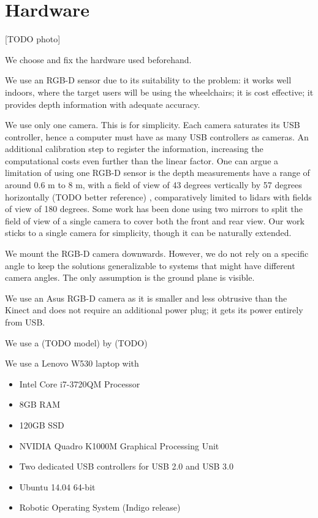 \section{Hardware}

[TODO photo]

We choose and fix the hardware used beforehand.

We use an RGB-D sensor due to its suitability to the problem:
it works well indoors, where the target users will be using the wheelchairs; it
is cost effective; it provides depth information with adequate accuracy.

We use only one camera. This is for simplicity. Each camera saturates its USB
controller, hence a computer must have as many USB controllers as cameras.
An additional calibration step to register the information, increasing the
computational costs even further than the linear factor. 
One can argue a limitation of using one RGB-D sensor is the depth measurements
have a range of around 0.6 m to 8 m, with a field of view of 43 degrees
vertically by 57 degrees horizontally (TODO better reference) \cite{endres2014catadioptric},
comparatively limited to lidars with fields of view of 180 degrees. Some work
\cite{endres2014catadioptric} has been done using two mirrors to split the field
of view of a single camera to cover both the front and rear view. Our work
sticks to a single camera for simplicity, though it can be naturally extended.

We mount the RGB-D camera downwards. However, we do not rely on a specific angle
to keep the solutions generalizable to systems that might have different camera
angles. The only assumption is the ground plane is visible.

We use an Asus RGB-D camera as it is smaller and less obtrusive than the Kinect
and does not require an additional power plug; it gets its power entirely from
USB.


We use a (TODO model) by (TODO) 

We use a Lenovo W530 laptop with 
\begin{itemize}
\item Intel Core i7-3720QM Processor
\item 8GB RAM
\item 120GB SSD
\item NVIDIA Quadro K1000M Graphical Processing Unit
\item Two dedicated USB controllers for USB 2.0 and USB 3.0
\item Ubuntu 14.04 64-bit
\item Robotic Operating System (Indigo release)
\end{itemize}


